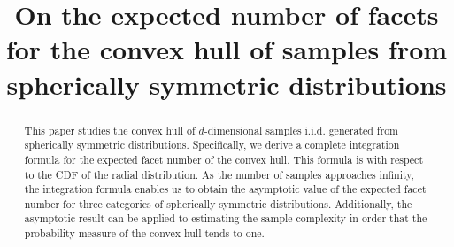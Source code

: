 \documentclass{aptpub}
\begin{document}

\title{On the expected number of facets for the convex hull of samples from spherically symmetric distributions} %






\begin{abstract}
This paper studies the convex hull of $d$-dimensional samples i.i.d. generated from spherically symmetric distributions. Specifically, we derive a complete integration formula for the expected facet number of the convex hull.
This formula is
with respect to the CDF of the radial distribution.
 As the number of samples approaches infinity,
 the integration formula enables us to obtain the asymptotic value of the expected facet number
 for three categories of spherically symmetric distributions.
 Additionally, the asymptotic result can be applied to estimating the sample complexity in order that
 the probability measure of the convex hull
 tends to one.
\end{abstract}



\end{document}
